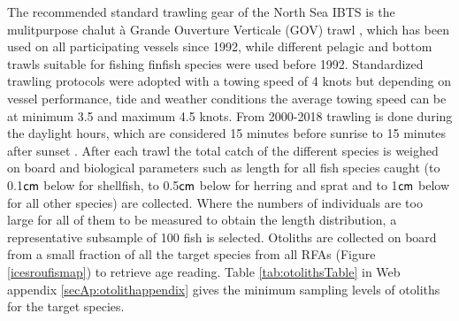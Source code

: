 \documentclass[a4paper 12pt]{article}
\numberwithin{equation}{section}
\newcommand{\cm}{\textnormal{\sffamily cm}\xspace}
\begin{document}
\indent The recommended standard trawling gear of the North Sea IBTS is the mulitpurpose chalut {\`a} Grande Ouverture Verticale (GOV) trawl \citep{ICES2012}, which has been used on all participating vessels since 1992, while different pelagic and bottom trawls suitable for fishing finfish species were used before 1992. Standardized trawling protocols were adopted with a towing speed of 4 knots but depending on vessel performance, tide and weather conditions the average towing speed can be at minimum 3.5 and maximum 4.5 knots. From 2000-2018 trawling is done during the daylight hours, which are considered 15 minutes before sunrise to 15 minutes  after sunset \citep{ICES2012}. After each trawl the total catch of the different species is weighed on board and biological parameters such as length for all fish species caught (to 0.1$\cm$ below for shellfish, to 0.5$\cm$ below for herring and sprat and to 1$\cm$ below for all other species) are collected. Where the numbers of individuals are too large for all of them  to be measured to obtain the length distribution, a representative subsample of 100 fish is selected. Otoliths are collected on board from a small fraction of all the target species from all RFAs (Figure \ref{icesroufismap}) to retrieve age reading. Table \ref{tab:otolithsTable} in Web appendix \ref{secAp:otolithappendix} gives the minimum sampling levels of otoliths for the target species.
\end{document}

